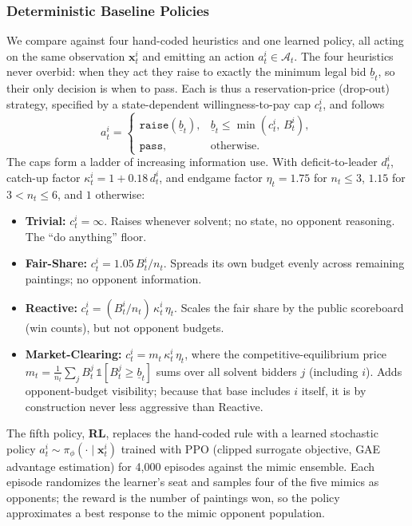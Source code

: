 \subsubsection{Deterministic Baseline Policies}
\label{sec:auction-baselines}
We compare against four hand-coded heuristics and one learned policy, all acting on the same observation $\mathbf{x}^i_t$ and emitting an action $a^i_t \in \mathcal{A}_t$. The four heuristics never overbid: when they act they raise to exactly the minimum legal bid $\underline{b}_t$, so their only decision is when to pass. Each is thus a reservation-price (drop-out) strategy, specified by a state-dependent willingness-to-pay cap $c^i_t$, and follows
\begin{equation}
a^i_t =
\begin{cases}
\texttt{raise}(\underline{b}_t), & \underline{b}_t \le \min(c^i_t,\, B^i_t),\\[2pt]
\texttt{pass}, & \text{otherwise.}
\end{cases}
\end{equation}
The caps form a ladder of increasing information use. With deficit-to-leader $d^i_t$, catch-up factor $\kappa^i_t = 1 + 0.18\,d^i_t$, and endgame factor $\eta_t = 1.75$ for $n_t \le 3$, $1.15$ for $3 < n_t \le 6$, and $1$ otherwise:
\begin{itemize}
\item \textbf{Trivial:} $c^i_t = \infty$. Raises whenever solvent; no state, no opponent reasoning. The ``do anything'' floor.
\item \textbf{Fair-Share:} $c^i_t = 1.05\,B^i_t / n_t$. Spreads its own budget evenly across remaining paintings; no opponent information.
\item \textbf{Reactive:} $c^i_t = (B^i_t / n_t)\,\kappa^i_t\,\eta_t$. Scales the fair share by the public scoreboard (win counts), but not opponent budgets.
\item \textbf{Market-Clearing:} $c^i_t = m_t\,\kappa^i_t\,\eta_t$, where the competitive-equilibrium price $m_t = \tfrac{1}{n_t}\sum_{j} B^j_t\,\mathbb{1}[B^j_t \ge \underline{b}_t]$ sums over all solvent bidders $j$ (including $i$). Adds opponent-budget visibility; because that base includes $i$ itself, it is by construction never less aggressive than Reactive.
\end{itemize}

The fifth policy, \textbf{RL}, replaces the hand-coded rule with a learned stochastic policy $a^i_t \sim \pi_\phi(\cdot \mid \mathbf{x}^i_t)$ trained with PPO (clipped surrogate objective, GAE advantage estimation) for 4{,}000 episodes against the mimic ensemble. Each episode randomizes the learner's seat and samples four of the five mimics as opponents; the reward is the number of paintings won, so the policy approximates a best response to the mimic opponent population.

